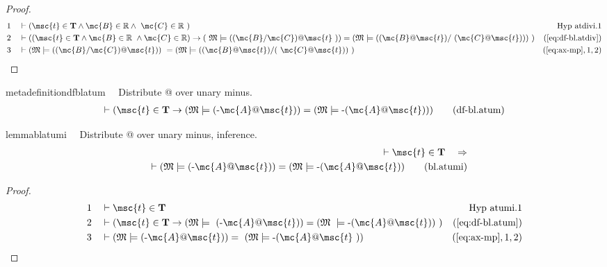 \begin{proof}
\begin{align}
  1 &&  & \vdash ( \msc{t} \in \mathbf{T} \wedge \mc{B} \in \mathbb{R} \wedge
     ~\mc{C} \in \mathbb{R}
     ~)&\text{Hyp~atdivi.1}\notag%
  \\ 2 &&  & \vdash ( ( \msc{t} \in \mathbf{T} \wedge \mc{B} \in \mathbb{R}
     ~\wedge \mc{C} \in \mathbb{R} ) \rightarrow (
     ~\mathfrak{M} \models ( ( \mc{B} / \mc{C} ) @ \msc{t}
     ~) ) = ( \mathfrak{M} \models ( ( \mc{B} @ \msc{t} ) /
     ~( \mc{C} @ \msc{t} ) ) )
     ~)&(\mbox{\ref{eq:df-bl.atdiv}})\notag
  \\ 3 &&  & \vdash ( \mathfrak{M} \models ( ( \mc{B} / \mc{C} ) @ \msc{t} ) )
     ~= ( \mathfrak{M} \models ( ( \mc{B} @ \msc{t} ) / (
     ~\mc{C} @ \msc{t} ) )
     ~)&(\mbox{\ref{eq:ax-mp}},1,2)\notag
\end{align}
\end{proof}

\begin{restatable}{metadefinition}{dfblatum}~~ Distribute @ over unary minus.
\begin{align}
\vdash ( \msc{t} \in \mathbf{T} \rightarrow ( \mathfrak{M} \models ( \textrm{-}
    \mc{A} @ \msc{t} ) ) = ( \mathfrak{M} \models \textrm{-} ( \mc{A} @ \msc{t}
    ) ) )\label{eq:df-bl.atum}\tag{df-bl.atum}
\end{align}
\end{restatable}

\begin{restatable}{lemma}{blatumi}~~ Distribute @ over unary minus, inference.
\begin{align}
\vdash \msc{t} \in \mathbf{T}\quad\Rightarrow \notag \\ 
	\quad \vdash ( \mathfrak{M}
    \models ( \textrm{-} \mc{A} @ \msc{t} ) ) = ( \mathfrak{M} \models
    \textrm{-} ( \mc{A} @ \msc{t} ) )\label{eq:bl.atumi}\tag{bl.atumi}
\end{align}
\end{restatable}

\begin{proof}
\begin{align}
  1 &&  & \vdash \msc{t} \in \mathbf{T}&\text{Hyp~atumi.1}\notag%
  \\ 2 &&  & \vdash ( \msc{t} \in \mathbf{T} \rightarrow ( \mathfrak{M} \models
     ~( \textrm{-} \mc{A} @ \msc{t} ) ) = ( \mathfrak{M}
     ~\models \textrm{-} ( \mc{A} @ \msc{t} ) )
     ~)&(\mbox{\ref{eq:df-bl.atum}})\notag
  \\ 3 &&  & \vdash ( \mathfrak{M} \models ( \textrm{-} \mc{A} @ \msc{t} ) ) =
     ~( \mathfrak{M} \models \textrm{-} ( \mc{A} @ \msc{t}
     ~) )&(\mbox{\ref{eq:ax-mp}},1,2)\notag
\end{align}
\end{proof}

